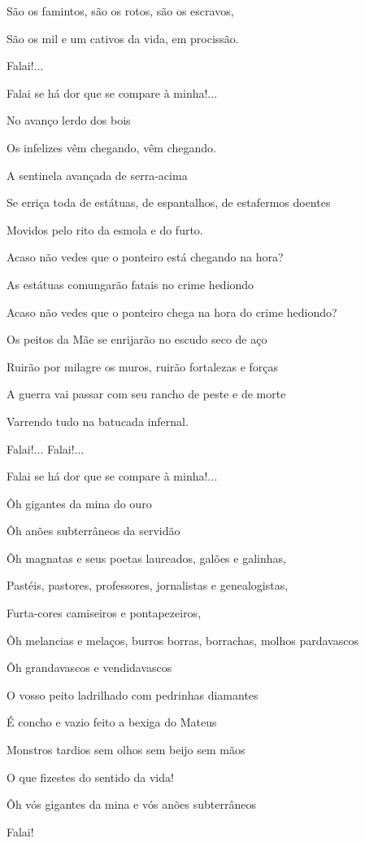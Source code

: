 São os famintos, são os rotos, são os escravos,

São os mil e um cativos da vida, em procissão.

Falai!...

Falai se há dor que se compare à minha!...

No avanço lerdo dos bois

Os infelizes vêm chegando, vêm chegando.

A sentinela avançada de serra-acima

Se erriça toda de estátuas, de espantalhos, de estafermos doentes

Movidos pelo rito da esmola e do furto.

Acaso não vedes que o ponteiro está chegando na hora?

As estátuas comungarão fatais no crime hediondo

Acaso não vedes que o ponteiro chega na hora do crime hediondo?

Os peitos da Mãe se enrijarão no escudo seco de aço

Ruirão por milagre os muros, ruirão fortalezas e forças

A guerra vai passar com seu rancho de peste e de morte

Varrendo tudo na batucada infernal.

Falai!... Falai!...

Falai se há dor que se compare à minha!...

Ôh gigantes da mina do ouro

Ôh anões subterrâneos da servidão

Ôh magnatas e seus poetas laureados, galões e galinhas,

Pastéis, pastores, professores, jornalistas e genealogistas,

Furta-cores camiseiros e pontapezeiros,

Ôh melancias e melaços, burros borras, borrachas, molhos pardavascos

Ôh grandavascos e vendidavascos

O vosso peito ladrilhado com pedrinhas diamantes

É concho e vazio feito a bexiga do Mateus

Monstros tardios sem olhos sem beijo sem mãos

O que fizestes do sentido da vida!

Ôh vós gigantes da mina e vós anões subterrâneos

Falai!

